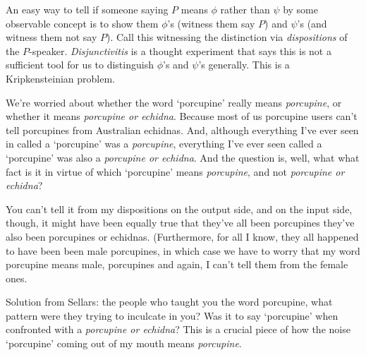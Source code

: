 An easy way to tell if someone saying $P$ means $\phi$ rather than $\psi$ by some observable concept is to show them $\phi$'s (witness them say $P$) and $\psi$'s (and witness them not say $P$). Call this witnessing the distinction via \emph{dispositions} of the $P$-speaker. \emph{Disjunctivitis} is a thought experiment that says this is not a sufficient tool for us to distinguish $\phi$'s and $\psi$'s generally. This is a Kripkensteinian problem.

We're worried about whether the word `porcupine' really means \emph{porcupine}, or whether it means \emph{porcupine or echidna}. Because most of us porcupine users can't tell porcupines from Australian echidnas. And, although everything I've ever seen in called a `porcupine' was a \emph{porcupine}, everything I've ever seen called a `porcupine' was also a \emph{porcupine or echidna}. And the question is, well, what what fact is it in virtue of which `porcupine' means \emph{porcupine}, and not \emph{porcupine or echidna}?

You can't tell it from my dispositions on the output side, and on the input side, though, it might have been equally true that they've all been porcupines they've also been porcupines or echidnas. (Furthermore, for all I know, they all happened to have been been male porcupines, in which case we have to worry that my word porcupine means male, porcupines and again, I can't tell them from the female ones.

Solution from Sellars: the people who taught you the word porcupine, what pattern were they trying to inculcate in you? Was it to say `porcupine' when confronted with a \emph{porcupine or echidna}? This is a crucial piece of how the noise `porcupine' coming out of my mouth means \emph{porcupine}.